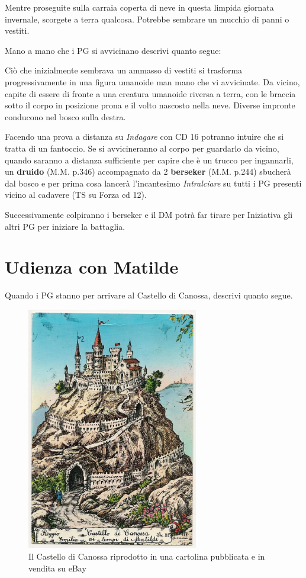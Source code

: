 \documentclass[letterpaper,twocolumn,openany,nodeprecatedcode]{dndbook}
\begin{document}
\begin{DndReadAloud}
Mentre proseguite sulla carraia coperta di neve in questa limpida giornata invernale, scorgete a terra qualcosa. Potrebbe sembrare un mucchio di panni o vestiti.
\end{DndReadAloud}

Mano a mano che i PG si avvicinano descrivi quanto segue:

\begin{DndReadAloud}
Ciò che inizialmente sembrava un ammasso di vestiti si trasforma progressivamente in una figura umanoide man mano che vi avvicinate. Da vicino, capite di essere di fronte a una creatura umanoide riversa a terra, con le braccia sotto il corpo in posizione prona e il volto nascosto nella neve. Diverse impronte conducono nel bosco sulla destra.
\end{DndReadAloud}

Facendo una prova a distanza su \textit{Indagare} con CD 16 potranno intuire che si tratta di un fantoccio. Se si avvicineranno al corpo per guardarlo da vicino, quando saranno a distanza sufficiente per capire che è un trucco per ingannarli, un \textbf{druido} (M.M. p.346) accompagnato da 2 \textbf{berseker} (M.M. p.244) sbucherà dal bosco e per prima cosa lancerà l'incantesimo \textit{Intralciare} su tutti i PG presenti vicino al cadavere (TS su Forza cd 12).

Successivamente colpiranno i berseker e il DM potrà far tirare per Iniziativa gli altri PG per iniziare la battaglia.







\section{Udienza con Matilde}
Quando i PG stanno per arrivare al Castello di Canossa, descrivi quanto segue.

\begin{figure}
\centering
\includegraphics[width=7.5cm]{img/castello.png}
\caption{Il Castello di Canossa riprodotto in una cartolina pubblicata e in vendita su eBay}
\label{castello}
\end{figure}
\end{document}
